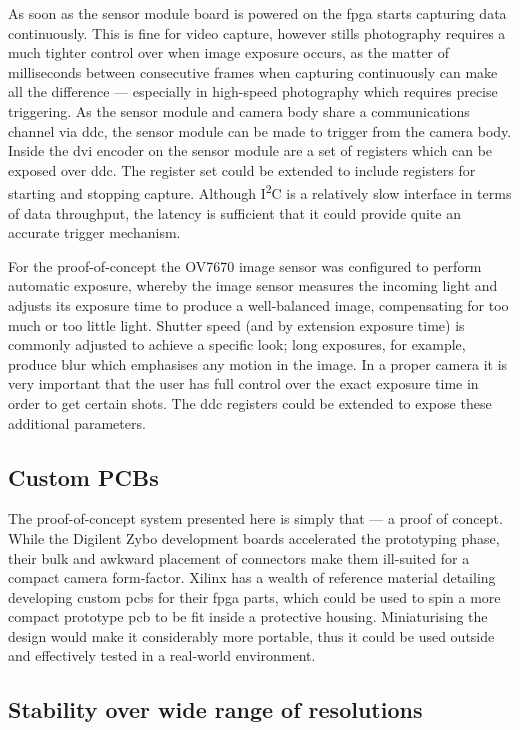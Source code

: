 As soon as the sensor module board is powered on the \gls{fpga} starts capturing data continuously. This is fine for video capture, however stills photography requires a much tighter control over when image exposure occurs, as the matter of milliseconds between consecutive frames when capturing continuously can make all the difference --- especially in high-speed photography which requires precise triggering. As the sensor module and camera body share a communications channel via \gls{ddc}, the sensor module can be made to trigger from the camera body. Inside the \gls{dvi} encoder on the sensor module are a set of registers which can be exposed over \gls{ddc}. The register set could be extended to include registers for starting and stopping capture. Although I\textsuperscript{2}C is a relatively slow interface in terms of data throughput, the latency is sufficient that it could provide quite an accurate trigger mechanism.

For the proof-of-concept the OV7670 image sensor was configured to perform automatic exposure, whereby the image sensor measures the incoming light and adjusts its exposure time to produce a well-balanced image, compensating for too much or too little light. Shutter speed (and by extension exposure time) is commonly adjusted to achieve a specific look; long exposures, for example, produce blur which emphasises any motion in the image. In a proper camera it is very important that the user has full control over the exact exposure time in order to get certain shots. The \gls{ddc} registers could be extended to expose these additional parameters.

\subsection{Custom PCBs}

The proof-of-concept system presented here is simply that --- a proof of concept. While the Digilent Zybo development boards accelerated the prototyping phase, their bulk and awkward placement of connectors make them ill-suited for a compact camera form-factor. Xilinx has a wealth of reference material detailing developing custom \glspl{pcb} for their \gls{fpga} parts, which could be used to spin a more compact prototype \gls{pcb} to be fit inside a protective housing. Miniaturising the design would make it considerably more portable, thus it could be used outside and effectively tested in a real-world environment.

\subsection{Stability over wide range of resolutions}

